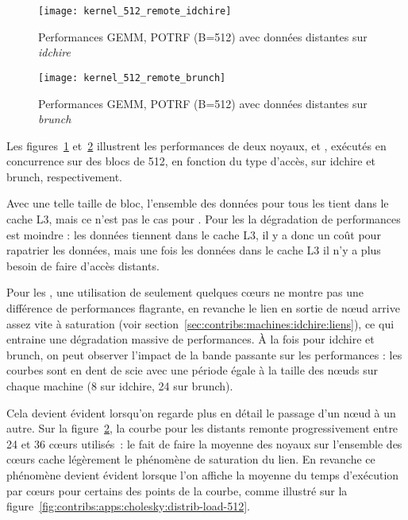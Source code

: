 \begin{figure}[t!]
  \centering
  \texttt{[image: kernel\_512\_remote\_idchire]}
  \caption{Performances GEMM, POTRF (B=512) avec données distantes sur \emph{idchire}}\label{fig:contribs:apps:cholesky:perf-512-remote-idchire}
\end{figure}
\begin{figure}[h!]
  \centering
  \texttt{[image: kernel\_512\_remote\_brunch]}
  \caption{Performances GEMM, POTRF (B=512) avec données distantes sur \emph{brunch}}\label{fig:contribs:apps:cholesky:perf-512-remote-brunch}
\end{figure}

Les figures~\ref{fig:contribs:apps:cholesky:perf-512-remote-idchire} et~\ref{fig:contribs:apps:cholesky:perf-512-remote-brunch} illustrent les performances de deux noyaux, \gemm et \potrf, exécutés en concurrence sur des blocs de 512, en fonction du type d'accès, sur idchire et brunch, respectivement.

Avec une telle taille de bloc, l'ensemble des données pour tous les \potrf tient dans le cache L3, mais ce n'est pas le cas pour \gemm.
Pour les \potrf la dégradation de performances est moindre : les données tiennent dans le cache L3, il y a donc un coût pour rapatrier les données, mais une fois les données dans le cache L3 il n'y a plus besoin de faire d'accès distants.

Pour les \gemm, une utilisation de seulement quelques cœurs ne montre pas une différence de performances flagrante, en revanche le lien en sortie de nœud arrive assez vite à saturation (voir section~\ref{sec:contribs:machines:idchire:liens}), ce qui entraine une dégradation massive de performances.
À la fois pour idchire et brunch, on peut observer l'impact de la bande passante sur les performances : les courbes sont en dent de scie avec une période égale à la taille des nœuds sur chaque machine (8 sur idchire, 24 sur brunch).

Cela devient évident lorsqu'on regarde plus en détail le passage d'un nœud à un autre.
Sur la figure~\ref{fig:contribs:apps:cholesky:perf-512-remote-brunch}, la courbe pour les \gemm distants remonte progressivement entre 24 et 36 cœurs utilisés~: le fait de faire la moyenne des noyaux sur l'ensemble des cœurs cache légèrement le phénomène de saturation du lien.
En revanche ce phénomène devient évident lorsque l'on affiche la moyenne du temps d'exécution par cœurs pour certains des points de la courbe, comme illustré sur la figure~\ref{fig:contribs:apps:cholesky:distrib-load-512}.

